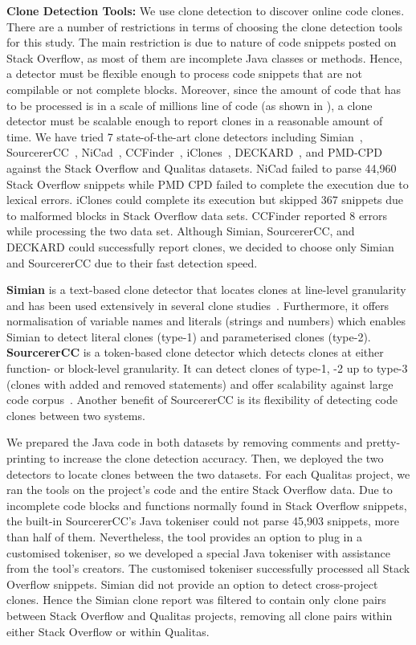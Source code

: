 \documentclass[10pt,journal,compsoc]{IEEEtran}
\begin{document}
\textbf{Clone Detection Tools: } We use clone detection to discover online code
clones. %
There are a number of restrictions in terms of choosing the clone detection
tools for this study. The main restriction is due to nature of code snippets
posted on Stack Overflow, as most of them are incomplete Java classes or
methods. Hence, a detector must be flexible enough to process code snippets that
are not compilable or not complete blocks. Moreover, since the amount of code
that has to be processed is in a scale of millions line of code (as shown in
), a clone detector must be scalable enough to report clones
in a reasonable amount of time. We have tried 7 state-of-the-art clone detectors
including Simian~\cite{simian}, SourcererCC~\cite{Sajnani2016},
NiCad~\cite{Cordy,Roy2008}, CCFinder~\cite{Kamiya2002}, iClones~\cite{Gode2009},
DECKARD~\cite{Jiang2007a}, and PMD-CPD~\cite{pmd-cpd} against the Stack Overflow
and Qualitas datasets. NiCad failed to parse 44,960 Stack Overflow snippets
while PMD CPD failed to complete the execution due to lexical errors. iClones
could complete its execution but skipped 367 snippets due to malformed blocks in
Stack Overflow data sets. CCFinder reported 8 errors while processing the two data set. 
Although Simian, SourcererCC, and DECKARD
could successfully report clones, we decided to choose only Simian and
SourcererCC due to their fast detection speed.

\textbf{Simian} is a text-based clone detector that locates clones at line-level
granularity and has been used extensively in several clone
studies~\cite{Ragkhitwetsagul2016, Wang2013, Mondal2011, Cheung2015,
	Krinke2010}. Furthermore, it offers normalisation of variable names and literals
(strings and numbers) which enables Simian to detect literal clones (type-1) and
parameterised clones (type-2). \textbf{SourcererCC} is a token-based clone
detector which detects clones at either function- or block-level granularity. It
can detect clones of type-1, -2 up to type-3 (clones with added and removed
statements) and offer scalability against large code
corpus~\cite{Sajnani2016,Saini2016,Yang2017}. Another benefit of SourcererCC is
its flexibility of detecting code clones between two systems.

We prepared the Java code in both datasets by removing comments and
pretty-printing to increase the clone detection accuracy. Then, we deployed the
two detectors to locate clones between the two datasets.  For each Qualitas
project, we ran the tools on the project's code and the entire Stack Overflow
data. Due to incomplete code blocks and functions
normally found in Stack Overflow snippets, the built-in SourcererCC's Java
tokeniser could not parse 45,903 snippets, more than half of them. Nevertheless,
the tool provides an option to plug in a customised tokeniser, so we developed a
special Java tokeniser with assistance from the tool's creators. The customised
tokeniser successfully processed all Stack Overflow snippets.
Simian did not provide an option to detect cross-project clones. Hence the
Simian clone report was filtered to contain only clone pairs between Stack
Overflow and Qualitas projects, removing all clone pairs within either Stack
Overflow or within Qualitas. 
\end{document}
